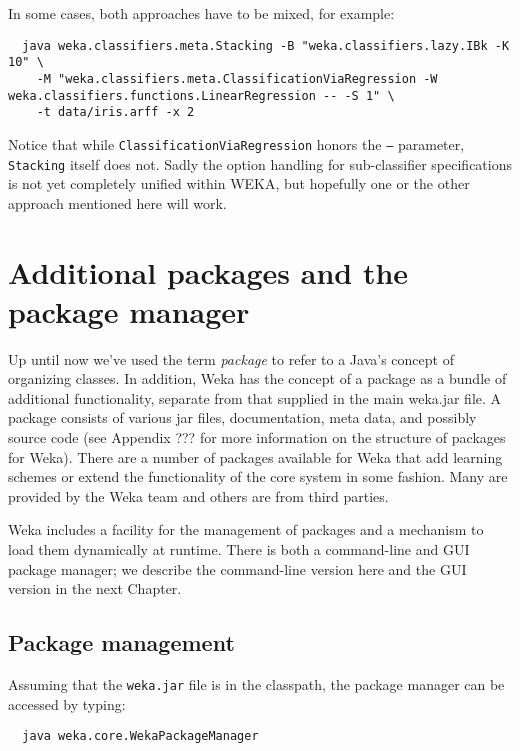 \noindent In some cases, both approaches have to be mixed, for example:

{\scriptsize
\begin{verbatim}
  java weka.classifiers.meta.Stacking -B "weka.classifiers.lazy.IBk -K 10" \
    -M "weka.classifiers.meta.ClassificationViaRegression -W weka.classifiers.functions.LinearRegression -- -S 1" \
    -t data/iris.arff -x 2
\end{verbatim}}

\noindent Notice that while \texttt{ClassificationViaRegression} honors the \texttt{--} parameter, \texttt{Stacking} itself does not. Sadly the option handling for sub-classifier specifications is not yet completely unified within WEKA, but hopefully one or the other approach mentioned here will work. 

\section{Additional packages and the package manager}

Up until now we've used the term {\it package} to refer to a Java's
concept of organizing classes. In addition, Weka has the concept of a
package as a bundle of additional functionality, separate from that
supplied in the main weka.jar file. A package consists of various jar
files, documentation, meta data, and possibly source code (see
Appendix ???  for more information on the structure of packages for
Weka). There are a number of packages available for Weka that add
learning schemes or extend the functionality of the core system in
some fashion. Many are provided by the Weka team and others are from
third parties.

Weka includes a facility for the management of packages and a
mechanism to load them dynamically at runtime. There is both a
command-line and GUI package manager; we describe the command-line
version here and the GUI version in the next Chapter.

\subsection{Package management}

Assuming that the \texttt{weka.jar} file is in the classpath, the
package manager can be accessed by typing:

{\scriptsize
\begin{verbatim}
  java weka.core.WekaPackageManager
\end{verbatim}}

